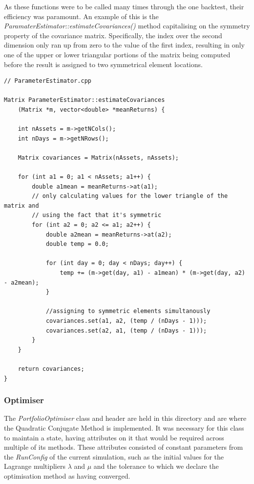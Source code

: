 \documentclass{article}
\begin{document}
As these functions were to be called many times through the one backtest, their efficiency was paramount. An example of this is the \textit{ParamaterEstimator::estimateCovariances()} method capitalising on the symmetry property of the covariance matrix. Specifically, the index over the second dimension only ran up from zero to the value of the first index, resulting in only one of the upper or lower triangular portions of the matrix being computed before the result is assigned to two symmetrical element locations.

\begin{lstlisting}
// ParameterEstimator.cpp

Matrix ParameterEstimator::estimateCovariances 
	(Matrix *m, vector<double> *meanReturns) {

	int nAssets = m->getNCols();
	int nDays = m->getNRows();
	
	Matrix covariances = Matrix(nAssets, nAssets);
	
	for (int a1 = 0; a1 < nAssets; a1++) {
		double a1mean = meanReturns->at(a1);
		// only calculating values for the lower triangle of the matrix and
		// using the fact that it's symmetric
		for (int a2 = 0; a2 <= a1; a2++) {
			double a2mean = meanReturns->at(a2);
			double temp = 0.0;
	
			for (int day = 0; day < nDays; day++) {
				temp += (m->get(day, a1) - a1mean) * (m->get(day, a2) - a2mean);
			}
			
			//assigning to symmetric elements simultanously
			covariances.set(a1, a2, (temp / (nDays - 1)));
			covariances.set(a2, a1, (temp / (nDays - 1))); 
		}
	}
	
	return covariances;
}
\end{lstlisting}


\subsubsection{Optimiser}
\label{sec:portfolio_optimiser}

The \textit{PortfolioOptimiser} class and header are held in this directory and are where the Quadratic Conjugate Method is implemented. It was necessary for this class to maintain a state, having attributes on it that would be required across multiple of its methods. These attributes consisted of constant parameters from the \textit{RunConfig} of the current simulation, such as the initial values for the Lagrange multipliers $\lambda$ and $\mu$ and the tolerance to which we declare the optimisation method as having converged. 
\end{document}
